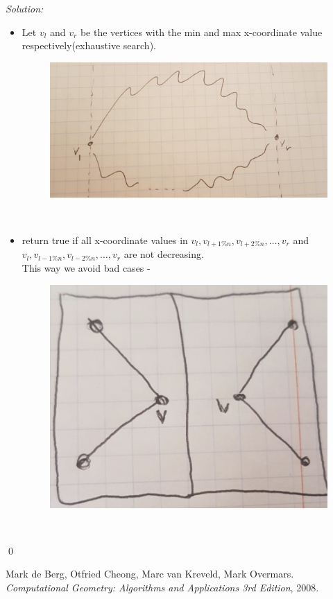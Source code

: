 \documentclass[a4paper, 8pt, oneside]{article}
\newenvironment{sol}
    {\emph{Solution:}
    }
    {
    \qed
    }
\begin{document}
\begin{enumerate}
\begin{sol}
 \begin{itemize}
   \item Let $v_l$ and $v_r$ be the  vertices with the min and max  x-coordinate value  respectively(exhaustive search).
    \begin{figure}[h!]
\includegraphics[scale=0.4]{chanis}
\centering
\end{figure} \\
\item  return true if all  x-coordinate values in  $v_l, v_{l+1\%n}, v_{l+2\%n}, \ldots, v_r$ and $v_l, v_{l-1\%n}, v_{l-2\%n}, \ldots, v_r$ are not decreasing.\\
This way we avoid bad cases -
    \begin{figure}[h!]
\includegraphics[scale=0.4]{ver}
\centering
\end{figure} \\
\end{itemize}

\end{sol}

\end{enumerate}


\medskip
 
\begin{thebibliography}{9}
Mark de Berg, Otfried Cheong, Marc van Kreveld, Mark Overmars.
\textit{Computational Geometry: Algorithms and Applications 3rd Edition}, 2008.
\end{thebibliography}
\end{document}
